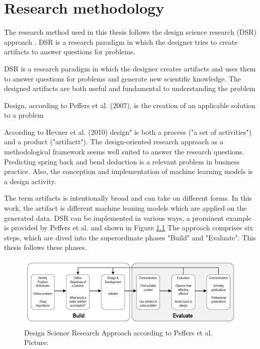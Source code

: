 \chapter{Research methodology} 

The research method used in this thesis follows the design science research (DSR) approach 
\cite[p. 17]{rennenkampff_managementitagilitaetentwicklung_2015}. 
DSR is a research paradigm in which the designer tries to create artifacts to answer questions for problems.

DSR is a research paradigm in which the designer creates artifacts and uses them to answer questions for problems and generate new scientific knowledge. 
The designed artifacts are both useful and fundamental to understanding the problem \cite[p. 10]{hevner_designscienceresearch_2010}

Design, according to Peffers et al. (2007), is the creation of an applicable solution to a problem \cite[p.47]{peffers_designscienceresearch_2007}

According to Hevner et al. (2010)
design" is both a process ("a set of activities") and a product ("artifactt"). \cite[p.78]{hevner_designscienceresearch_2010}
The design-oriented research approach as a methodological framework seems well suited to answer the research questions.
Predicting spring back and bend deduction is a relevant problem in business practice. 
Also, the conception and implementation of machine learning models is a design activity. 

The term artifacts is intentionally broad and can take on different forms. In this work, the artifact is different machine leaning models which are applied on the generated data. 
DSR can be implemented in various ways, a prominent example is provided by Peffers et al. and shown in Figure \ref{fig:dsr_process}
The approach comprises six steps, which are dived into the superordinate phases "Build" and "Evaluate". This thesis follows these phases.

 \begin{figure}[H]
	\centering
	\includegraphics[width=1.1\linewidth]{chap3/images/dsr_process.png}
	\caption[DSR Process]{Design Science Research Approach according to Peffers et al. Picture: \cite[p. 72]{sonnenberg_evaluationpatternsdesign_2012}}
	\label{fig:dsr_process}
\end{figure}


